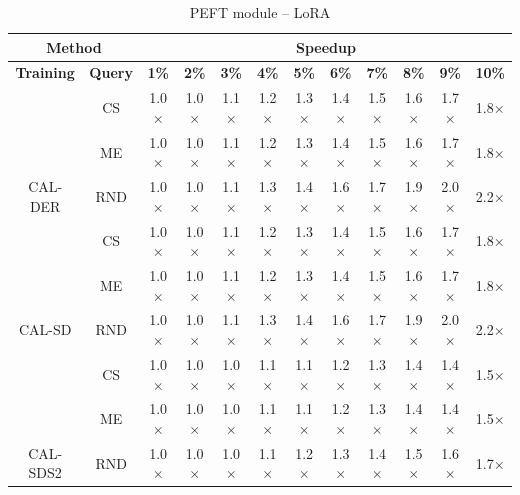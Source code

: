 \begin{table}[htbp]
\centering
\begin{subtable}{\linewidth}
\centering
\caption{PEFT module -- Adapter}

\begin{tabular}{c|c|cccccccccc}
\toprule
\multicolumn{2}{c|}{\textbf{Method}} & \multicolumn{10}{c}{\textbf{Speedup}} \\
\midrule
\textbf{Training} & \textbf{Query} & \textbf{1\%} & \textbf{2\%} & \textbf{3\%} & \textbf{4\%} & \textbf{5\%} & \textbf{6\%} & \textbf{7\%} & \textbf{8\%} & \textbf{9\%} & \textbf{10\%}\\
\midrule
 & CS & 1.0$\times$ & 1.0$\times$ & 1.1$\times$ & 1.2$\times$ & 1.3$\times$ & 1.4$\times$ & 1.5$\times$ & 1.6$\times$ & 1.7$\times$ & 1.8$\times$\\

 & ME & 1.0$\times$ & 1.0$\times$ & 1.1$\times$ & 1.2$\times$ & 1.3$\times$ & 1.4$\times$ & 1.5$\times$ & 1.6$\times$ & 1.7$\times$ & 1.8$\times$\\

\multirow{-3}{*}{\raggedright\arraybackslash CAL-DER} & RND & 1.0$\times$ & 1.0$\times$ & 1.1$\times$ & 1.3$\times$ & 1.4$\times$ & 1.6$\times$ & 1.7$\times$ & 1.9$\times$ & 2.0$\times$ & 2.2$\times$\\
\midrule
 & CS & 1.0$\times$ & 1.0$\times$ & 1.1$\times$ & 1.2$\times$ & 1.3$\times$ & 1.4$\times$ & 1.5$\times$ & 1.6$\times$ & 1.7$\times$ & 1.8$\times$\\

 & ME & 1.0$\times$ & 1.0$\times$ & 1.1$\times$ & 1.2$\times$ & 1.3$\times$ & 1.4$\times$ & 1.5$\times$ & 1.6$\times$ & 1.7$\times$ & 1.8$\times$\\

\multirow{-3}{*}{\raggedright\arraybackslash CAL-SD} & RND & 1.0$\times$ & 1.0$\times$ & 1.1$\times$ & 1.3$\times$ & 1.4$\times$ & 1.6$\times$ & 1.7$\times$ & 1.9$\times$ & 2.0$\times$ & 2.2$\times$\\
\midrule
 & CS & 1.0$\times$ & 1.0$\times$ & 1.0$\times$ & 1.1$\times$ & 1.1$\times$ & 1.2$\times$ & 1.3$\times$ & 1.4$\times$ & 1.4$\times$ & 1.5$\times$\\

 & ME & 1.0$\times$ & 1.0$\times$ & 1.0$\times$ & 1.1$\times$ & 1.1$\times$ & 1.2$\times$ & 1.3$\times$ & 1.4$\times$ & 1.4$\times$ & 1.5$\times$\\

\multirow{-3}{*}{\raggedright\arraybackslash CAL-SDS2} & RND & 1.0$\times$ & 1.0$\times$ & 1.0$\times$ & 1.1$\times$ & 1.2$\times$ & 1.3$\times$ & 1.4$\times$ & 1.5$\times$ & 1.6$\times$ & 1.7$\times$\\
\bottomrule
\end{tabular}
\end{subtable}
\vspace{1em}
\begin{subtable}{\linewidth}
\centering
\caption{PEFT module -- LoRA}


\end{subtable}
\end{table}
